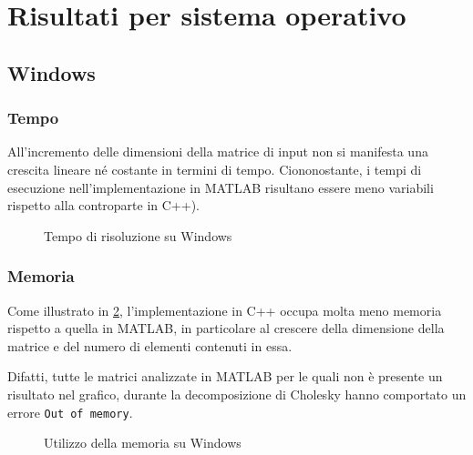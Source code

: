 \documentclass[11pt,italian]{article}
\begin{document}
\newpage
\section{Risultati per sistema operativo}
\label{section-results-impl}

\subsection{Windows}
\subsubsection*{Tempo}
All'incremento delle dimensioni della matrice di input non si manifesta una crescita lineare né costante in termini di tempo.
Ciononostante, i tempi di esecuzione nell'implementazione in MATLAB risultano essere meno variabili rispetto alla controparte in C++).
\begin{figure}[H]
    \caption{Tempo di risoluzione su Windows}
    \label{fig:windows-time}
\end{figure}

\smallskip
\subsubsection*{Memoria}
Come illustrato in \cref{fig:windows-memory}, l'implementazione in C++ occupa molta meno memoria rispetto a quella in MATLAB, in particolare al crescere della dimensione della matrice e del numero di elementi contenuti in essa.

Difatti, tutte le matrici analizzate in MATLAB per le quali non è presente un risultato nel grafico, durante la decomposizione di Cholesky hanno comportato un errore \lstinline{Out of memory}.
\begin{figure}[H]
    \caption{Utilizzo della memoria su Windows}
    \label{fig:windows-memory}
\end{figure}
\end{document}
